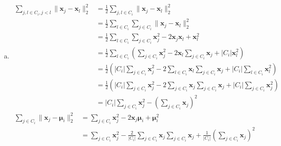 \documentclass[12pt]{article}
\newenvironment{solution}[2][Solution]{\begin{trivlist}
\item[\hskip \labelsep {\bfseries #1}\hskip \labelsep {\bfseries #2.}]}{\end{trivlist}}
\begin{document}
\begin{solution}{5}
    ~
    \begin{enumerate}[(a)]
        \item \begin{align*}
                  \sum_{j,l \in C_i, j < l}\|\mathbf{x}_j-\mathbf{x}_l\|_2^2 & = \frac12 \sum_{j,l \in C_i}\|\mathbf{x}_j-\mathbf{x}_l\|_2^2                                                                                     \\
                                                                             & = \frac12 \sum_{l \in C_i}\sum_{j \in C_i}\|\mathbf{x}_j-\mathbf{x}_l\|_2^2                                                                       \\
                                                                             & = \frac12 \sum_{l \in C_i}\sum_{j \in C_i}\mathbf{x}_j^2 - 2\mathbf{x}_j\mathbf{x}_l + \mathbf{x}_l^2                                             \\
                                                                             & = \frac12 \sum_{l \in C_i}(\sum_{j \in C_i}\mathbf{x}_j^2 - 2\mathbf{x}_l\sum_{j \in C_i}\mathbf{x}_j + |C_i|\mathbf{x}_l^2)                      \\
                                                                             & = \frac12 (|C_i|\sum_{j \in C_i}\mathbf{x}_j^2 - 2\sum_{l \in C_i}\mathbf{x}_l\sum_{j \in C_i}\mathbf{x}_j + |C_i|\sum_{l \in C_i}\mathbf{x}_l^2) \\
                                                                             & = \frac12 (|C_i|\sum_{j \in C_i}\mathbf{x}_j^2 - 2\sum_{j \in C_i}\mathbf{x}_j\sum_{j \in C_i}\mathbf{x}_j + |C_i|\sum_{j \in C_i}\mathbf{x}_j^2) \\
                                                                             & = |C_i|\sum_{j \in C_i}\mathbf{x}_j^2 - (\sum_{j \in C_i}\mathbf{x}_j)^2
              \end{align*}
              \begin{align*}
                  \sum_{j \in C_i}\|\mathbf{x}_j-\mathbf{\mu}_i\|_2^2 & = \sum_{j \in C_i}\mathbf{x}_j^2 - 2\mathbf{x}_j\mathbf{\mu}_i + \mathbf{\mu}_i^2                                                                        \\
                                                                      & = \sum_{j \in C_i}\mathbf{x}_j^2 - \frac2{|C_i|}\sum_{j \in C_i}\mathbf{x}_j\sum_{j \in C_i}\mathbf{x}_j + \frac1{|C_i|}(\sum_{j \in C_i}\mathbf{x}_j)^2 \\

\end{align*}
\end{enumerate}
\end{solution}
\end{document}
